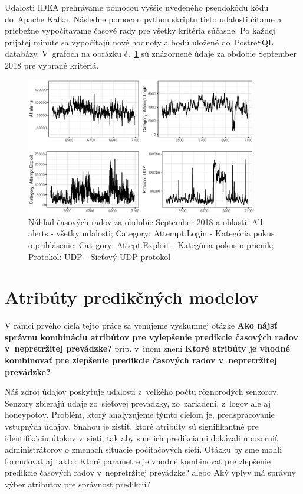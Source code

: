 \documentclass[thesismargins, thesislinespacing, openright, upjsfrontpage]{rnthesis}
\begin{document}
Udalosti IDEA prehrávame pomocou vyššie uvedeného pseudokódu kódu do~Apache Kafka. Následne pomocou python skriptu tieto udalosti čítame a priebežne vypočítavame časové rady pre všetky kritéria súčasne. Po každej prijatej minúte sa vypočítajú nové hodnoty a bodú uložené do~PostreSQL databázy. V~grafoch na obrázku č.~\ref{fig:timeseries_example} sú znázornené údaje za obdobie September 2018 pre vybrané kritériá.

\begin{figure}[h]
  \centering
  \includegraphics[width=0.9\textwidth]{images/TestFig3.eps}
  \caption{Náhľad časových radov za obdobie September 2018 a oblasti: All alerts - všetky udalosti; Category: Attempt.Login - Kategória pokus o prihlásenie; Category: Attept.Exploit - Kategória pokus o prienik; Protokol: UDP - Sieťový UDP protokol}
  \label{fig:timeseries_example}
\end{figure}

\section{Atribúty predikčných modelov}
V rámci prvého cieľa tejto práce sa venujeme výskumnej otázke \textbf{Ako nájsť správnu kombináciu atribútov pre vylepšenie predikcie časových radov v~nepretržitej prevádzke?} príp. v~inom znení \textbf{Ktoré atribúty je vhodné kombinovať pre zlepšenie predikcie časových radov v~nepretržitej prevádzke?}

Náš zdroj údajov poskytuje udalosti z~veľkého počtu rôznorodých senzorov. Senzory zbierajú údaje zo~sieťovej prevádzky, zo~zariadení, z~logov ale aj honeypotov. Problém, ktorý analyzujeme týmto cieľom je, predspracovanie vstupných údajov. Snahou je zistiť, ktoré atribúty sú signifikantné pre identifikáciu útokov v~sieti, tak aby sme ich predikciami dokázali upozorniť administrátorov o zmenách situácie počítačových sietí. Otázku by sme mohli formulovať aj takto: Ktoré parametre je vhodné kombinovať pre zlepšenie predikcie časových radov v~nepretržitej prevádzke? alebo Aký vplyv má správny výber atribútov pre správnosť predikcií?
\end{document}
